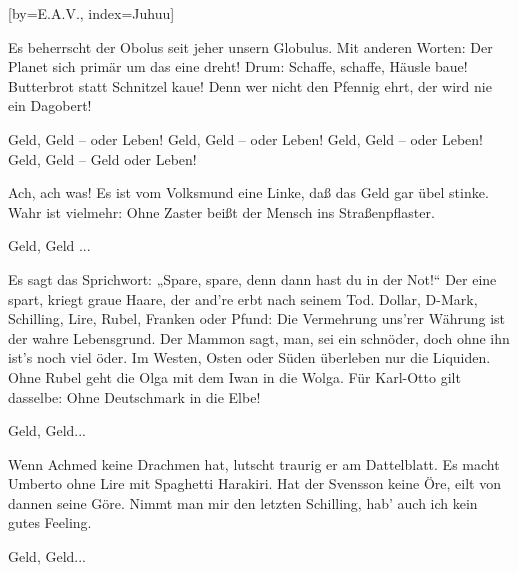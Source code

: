 [by={E.A.V.}, index={Juhuu}]

\beginverse
Es beherrscht der Obolus seit jeher unsern Globulus.
Mit anderen Worten: Der Planet sich primär um das eine dreht!
Drum: Schaffe, schaffe, Häusle baue! Butterbrot statt Schnitzel kaue! 
Denn wer nicht den Pfennig ehrt, der wird nie ein Dagobert!
\endverse

\beginchorus
Geld, Geld -- oder Leben!
Geld, Geld -- oder Leben!
Geld, Geld -- oder Leben!
Geld, Geld -- Geld oder Leben!
\endchorus

\beginverse
Ach, ach was!
Es ist vom Volksmund eine Linke,
daß das Geld gar übel stinke.
Wahr ist vielmehr: Ohne Zaster
beißt der Mensch ins Straßenpflaster.

Geld, Geld ...
\endverse

\beginverse
Es sagt das Sprichwort: „Spare, spare,
denn dann hast du in der Not!“
Der eine spart, kriegt graue Haare,
der and're erbt nach seinem Tod.
\endverse
\beginverse
Dollar, D-Mark, Schilling, Lire,
Rubel, Franken oder Pfund:
Die Vermehrung uns'rer Währung
ist der wahre Lebensgrund.
\endverse
\beginverse
Der Mammon sagt, man, sei ein schnöder,
doch ohne ihn ist's noch viel öder.
Im Westen, Osten oder Süden
überleben nur die Liquiden.
\endverse
\beginverse
Ohne Rubel geht die Olga
mit dem Iwan in die Wolga.
Für Karl-Otto gilt dasselbe:
Ohne Deutschmark in die Elbe!

Geld, Geld...
\endverse

\beginverse
Wenn Achmed keine Drachmen hat,
lutscht traurig er am Dattelblatt.
Es macht Umberto ohne Lire
mit Spaghetti Harakiri.
\endverse
\beginverse
Hat der Svensson keine Öre,
eilt von dannen seine Göre.
Nimmt man mir den letzten Schilling,
hab' auch ich kein gutes Feeling.
\endverse

\beginchorus
Geld, Geld...
\endchorus


\endsong